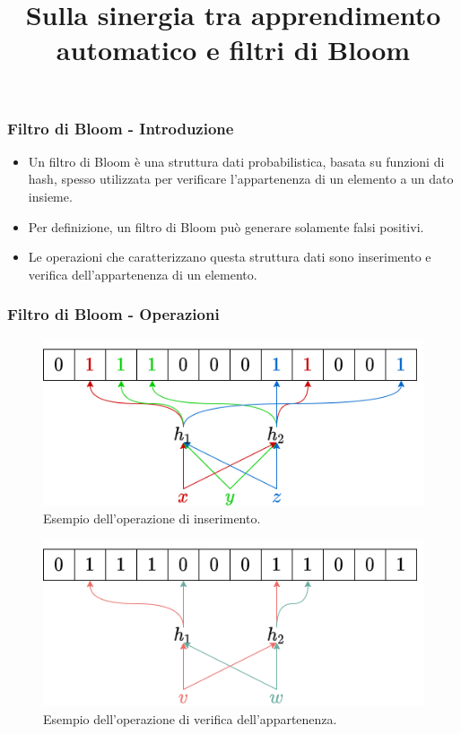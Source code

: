 \documentclass{beamer}
\title{Sulla sinergia tra apprendimento automatico e filtri di Bloom}
\author{{Giacomo Fumagalli}\\
{\and} \\
{Relatore: Prof. Dario Malchiodi} \\ {Correlatore: Prof. Marco Frasca}}
\date{}
\begin{document}
\frame{\titlepage}

\begin{frame}
\frametitle{Filtro di Bloom - Introduzione}
\begin{itemize}
    \item Un filtro di Bloom \cite{Bloom1970SpacetimeTI} è una struttura dati probabilistica, basata su funzioni di hash, spesso utilizzata per verificare l'appartenenza di un elemento a un dato insieme.
    \item Per definizione, un filtro di Bloom può generare solamente falsi positivi.
    \item Le operazioni che caratterizzano questa struttura dati sono inserimento e verifica dell'appartenenza di un elemento.
\end{itemize}
\end{frame}

\begin{frame}
\frametitle{Filtro di Bloom - Operazioni}
\centering
\begin{figure}[t!]
    \includegraphics[height=\dimexpr0.4\textheight-0.5in]{immagini/3/bloomFilterInserimento.png}
    \caption{Esempio dell'operazione di inserimento.}
\end{figure}
\begin{figure}[t!]
    \includegraphics[height=\dimexpr0.4\textheight-0.5in]{immagini/3/bloomFilterCheck.png}
    \caption{Esempio dell'operazione di verifica dell'appartenenza.}
\end{figure}
\end{frame}
\end{document}

